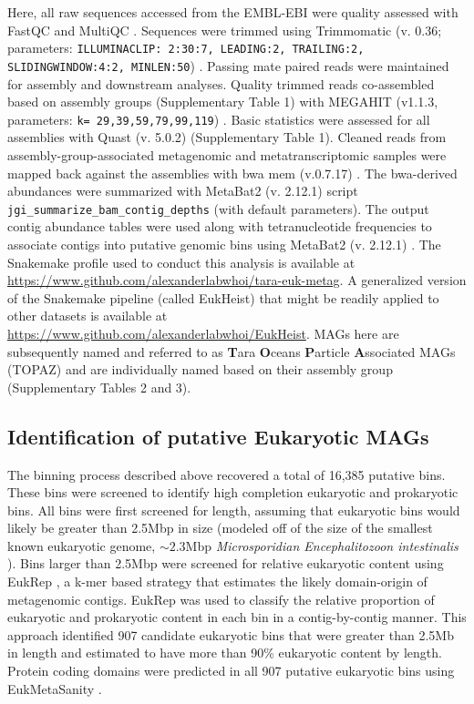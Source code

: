 \documentclass[12pt]{article}
\numberwithin{equation}{section}
\begin{document}
Here, all raw sequences accessed from the EMBL-EBI were quality assessed with FastQC and MultiQC \citep{Andrews2010FastQC}. Sequences were trimmed using Trimmomatic (v. 0.36; parameters: \texttt{ILLUMINACLIP: 2:30:7, LEADING:2, TRAILING:2, SLIDINGWINDOW:4:2, MINLEN:50}) \citep{Bolger2014Trimmomatic}. Passing mate paired reads were maintained for assembly and downstream analyses. Quality trimmed reads co-assembled based on assembly groups (Supplementary Table 1) with MEGAHIT (v1.1.3, parameters: \texttt{k= 29,39,59,79,99,119}) \citep{Li2015MEGAHIT}. Basic statistics were assessed for all assemblies with Quast (v. 5.0.2) \citep{Gurevich_2013} (Supplementary Table 1). Cleaned reads from assembly-group-associated metagenomic and metatranscriptomic samples were mapped back against the assemblies with bwa mem (v.0.7.17) \citep{Li2010Fast}. The bwa-derived abundances were summarized with MetaBat2 (v. 2.12.1) script \texttt{jgi\_summarize\_bam\_contig\_depths} (with default parameters). The output contig abundance tables were used along with tetranucleotide frequencies to associate contigs into putative genomic bins using MetaBat2 (v. 2.12.1) \citep{Kang_2019}. The Snakemake profile used to conduct this analysis is available at \url{https://www.github.com/alexanderlabwhoi/tara-euk-metag}. A generalized version of the Snakemake pipeline (called EukHeist) that might be readily applied to other datasets is available at \url{https://www.github.com/alexanderlabwhoi/EukHeist}. MAGs here are subsequently named and referred to as \textbf{T}ara \textbf{O}ceans \textbf{P}article \textbf{A}ssociated MAGs (TOPAZ) and are individually named based on their assembly group (Supplementary Tables 2 and 3).

\subsection*{Identification of putative Eukaryotic MAGs} The binning process described above recovered a total of 16,385 putative bins. These bins were screened to identify high completion eukaryotic and prokaryotic bins. All bins were first screened for length, assuming that eukaryotic bins would likely be greater than 2.5Mbp in size (modeled off of the size of the smallest known eukaryotic genome, $\sim 2.3$Mbp \textit{Microsporidian Encephalitozoon intestinalis} \citep{Corradi2010complete}). Bins larger than 2.5Mbp were screened for relative eukaryotic content using EukRep \citep{West2018Genome-reconstruction}, a k-mer based strategy that estimates the likely domain-origin of metagenomic contigs. EukRep was used to classify the relative proportion of eukaryotic and prokaryotic content in each bin in a contig-by-contig manner. This approach identified 907 candidate eukaryotic bins that were greater than 2.5Mb in length and estimated to have more than 90\% eukaryotic content by length. Protein coding domains were predicted in all 907 putative eukaryotic bins using EukMetaSanity \citep{EukMS}. 
\end{document}

